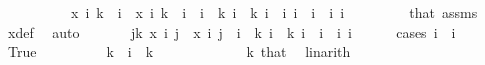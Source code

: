 \begin{isabellebody}
\ \ \isamarkupfalse%
\ {\isacharminus}{\kern0pt}\isanewline
\ \ \ \ \isamarkupfalse%
\ {\isacharasterisk}{\kern0pt}{\isacharcolon}{\kern0pt}{\isachardoublequoteopen}x\ i{}\ {\isacharparenleft}{\kern0pt}k\ {\isacharminus}{\kern0pt}\ i{}{\isacharparenright}{\kern0pt}\ {\isasymnoteq}\ x\ i{}\ {\isacharparenleft}{\kern0pt}k\ {\isacharminus}{\kern0pt}\ i{}{\isacharparenright}{\kern0pt}{\isachardoublequoteclose}\ \ {\isachardoublequoteopen}i{}\ {\isasymle}\ k{\isachardoublequoteclose}\ {\isachardoublequoteopen}i{}\ {\isasymle}\ k{\isachardoublequoteclose}\ {\isachardoublequoteopen}i{}\ {\isasymnoteq}\ i{}{\isachardoublequoteclose}\ {\isachardoublequoteopen}i{}\ {\isacharless}{\kern0pt}\ i{}{\isachardoublequoteclose}\ \ i{}\ i{}\ \isanewline
\ \ \ \ \ \ \isamarkupfalse%
\ that\ assms{\isacharparenleft}{\kern0pt}{}{\isacharparenright}{\kern0pt}\ \isamarkupfalse%
\ x{\isacharunderscore}{\kern0pt}def\ \isamarkupfalse%
\ auto\ \isanewline
\ \ \ \ \isamarkupfalse%
\ {\isachardoublequoteopen}{\isasymexists}j{\isacharless}{\kern0pt}k{\isachardot}{\kern0pt}\ x\ i{}\ j\ {\isasymnoteq}\ x\ i{}\ j{\isachardoublequoteclose}\ \ {\isachardoublequoteopen}i{}\ {\isasymle}\ k{\isachardoublequoteclose}\ {\isachardoublequoteopen}i{}\ {\isasymle}\ k{\isachardoublequoteclose}\ {\isachardoublequoteopen}i{}\ {\isasymnoteq}\ i{}{\isachardoublequoteclose}\ \ i{}\ i{}\isanewline
\ \ \ \ \isamarkupfalse%
\ {\isacharparenleft}{\kern0pt}cases\ {\isachardoublequoteopen}i{}\ {\isasymle}\ i{}{\isachardoublequoteclose}{\isacharparenright}{\kern0pt}\isanewline
\ \ \ \ \ \ \isamarkupfalse%
\ True\isanewline
\ \ \ \ \ \ \isamarkupfalse%
\ \isamarkupfalse%
\ {\isachardoublequoteopen}k\ {\isacharminus}{\kern0pt}\ i{}\ {\isacharless}{\kern0pt}\ k{\isachardoublequoteclose}\ \isanewline
\ \ \ \ \ \ \ \ \isamarkupfalse%
\ {\isacartoucheopen}{}\ {\isacharless}{\kern0pt}\ k{\isacartoucheclose}\ that{\isacharparenleft}{\kern0pt}{}{\isacharparenright}{\kern0pt}\ \isamarkupfalse%
\ linarith\isanewline
\ \ \ \ \ \ \isamarkupfalse%

\end{isabellebody}
